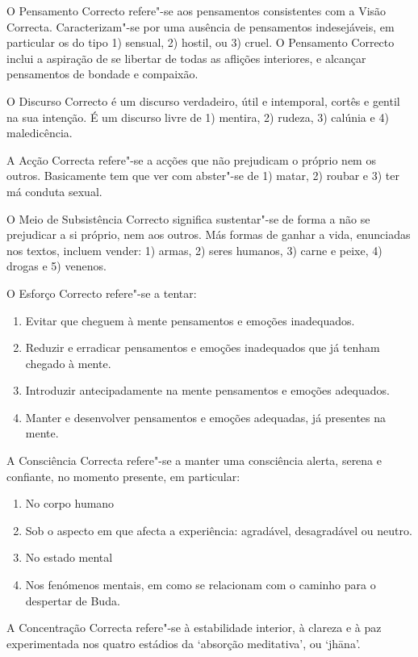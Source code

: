 O Pensamento Correcto refere"-se aos pensamentos consistentes com a Visão
Correcta. Caracterizam"-se por uma ausência de pensamentos indesejáveis,
em particular os do tipo 1) sensual, 2) hostil, ou 3) cruel. O
Pensamento Correcto inclui a aspiração de se libertar de todas as
aflições interiores, e alcançar pensamentos de bondade e compaixão.

O Discurso Correcto é um discurso verdadeiro, útil e intemporal, cortês
e gentil na sua intenção. É um discurso livre de 1) mentira, 2) rudeza,
3) calúnia e 4) maledicência.

A Acção Correcta refere"-se a acções que não prejudicam o próprio nem os
outros. Basicamente tem que ver com abster"-se de 1) matar, 2) roubar e
3) ter má conduta sexual.

O Meio de Subsistência Correcto significa sustentar"-se de forma a não se
prejudicar a si próprio, nem aos outros. Más formas de ganhar a vida,
enunciadas nos textos, incluem vender: 1) armas, 2) seres humanos, 3)
carne e peixe, 4) drogas e 5) venenos.

O Esforço Correcto refere"-se a tentar:

\begin{enumerate}[topsep=0pt,parsep=0pt]
\item Evitar que cheguem à mente pensamentos e emoções inadequados.
\item Reduzir e erradicar pensamentos e emoções inadequados que já tenham chegado à mente.
\item Introduzir antecipadamente na mente pensamentos e emoções adequados.
\item Manter e desenvolver pensamentos e emoções adequadas, já presentes na mente.
\end{enumerate}

A Consciência Correcta refere"-se a manter uma consciência alerta, serena
e confiante, no momento presente, em particular:

\begin{enumerate}[topsep=0pt,parsep=0pt]
\item No corpo humano
\item Sob o aspecto em que afecta a experiência: agradável, desagradável ou neutro.
\item No estado mental
\item Nos fenómenos mentais, em como se relacionam com o caminho para o despertar de Buda.
\end{enumerate}

A Concentração Correcta refere"-se à estabilidade interior, à clareza e à
paz experimentada nos quatro estádios da `absorção meditativa', ou `jhāna'.


